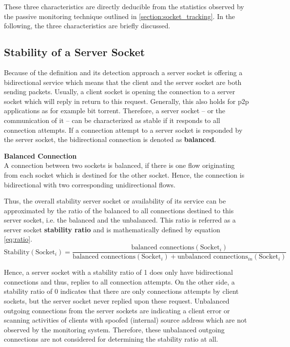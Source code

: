 These three characteristics are directly deducible from the statistics observed
by the passive monitoring technique outlined in \ref{section:socket_tracking}.
In the following, the three characteristics are briefly discussed.

\subsection{Stability of a Server Socket} Because of the definition and its
detection approach a \gls{server socket} is offering a bidirectional service
which means that the client and the \gls{server socket} are both sending
packets. Usually, a client socket is opening the connection to a \gls{server
socket} which will reply in return to this request. Generally, this also holds
for \gls{p2p} applications as for example bit torrent. Therefore, a
\gls{server socket} -- or the communication of it -- can be characterized as
stable if it responds to all connection attempts. If a connection attempt to a \gls{server socket} is responded by the \gls{server socket}, the bidirectional connection is denoted as \textbf{balanced}.

\parbox{
\textwidth}{
\begin{defn}
	{\textbf{Balanced Connection}\\} A connection between two sockets is balanced, if there is one flow originating from each socket which is destined for the other socket. Hence, the connection is bidirectional with two corresponding unidirectional flows.
\end{defn}
}

Thus, the overall stability \gls{server socket} or availability of its service
can be approximated by the ratio of the balanced to all connections destined to
this \gls{server socket}, i.e. the balanced and the unbalanced. This ratio is
referred as a \gls{server socket} \textbf{stability ratio} and is mathematically
defined by equation \ref{eq:ratio}.
\begin{equation}
	\text{Stability}(\text{Socket}_i) = \frac{\text{balanced connections}(\text{Socket}_i)}{\text{balanced connections}(\text{Socket}_i) + \text{unbalanced connections}_{in}(\text{Socket}_i)}
	\label{eq:ratio}
\end{equation}

Hence, a \gls{server socket} with a stability ratio of 1 does only have
bidirectional connections and thus, replies to all connection attempts. On the
other side, a stability ratio of 0 indicates that there are only connections
attempts by client sockets, but the \gls{server socket} never replied upon these
request. Unbalanced outgoing connections from the \glspl{server socket} are
indicating a client error or scanning activities of clients with spoofed
(internal) source address which are not observed by the monitoring system.
Therefore, these unbalanced outgoing connections are not considered for
determining the stability ratio at all.

